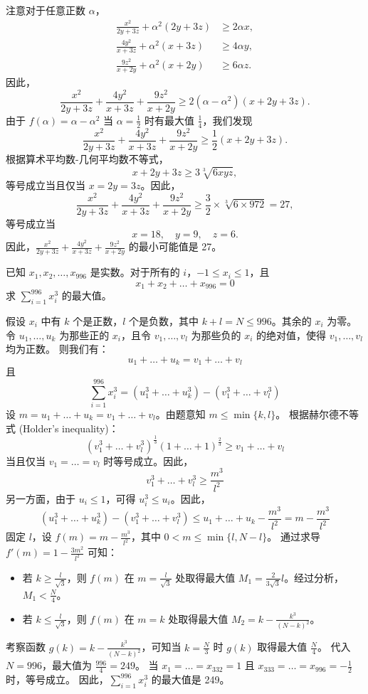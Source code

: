 \begin{questions}
\begin{solution}
注意对于任意正数 $\alpha$，
\begin{align*}
\frac{x^2}{2y + 3z} + \alpha^2(2y + 3z) &\ge 2\alpha x, \\
\frac{4y^2}{x + 3z} + \alpha^2(x + 3z) &\ge 4\alpha y, \\
\frac{9z^2}{x + 2y} + \alpha^2(x + 2y) &\ge 6\alpha z.
\end{align*}
因此，
\[
\frac{x^2}{2y + 3z} + \frac{4y^2}{x + 3z} + \frac{9z^2}{x + 2y} \ge 2(\alpha - \alpha^2)(x + 2y + 3z).
\]
由于 $f(\alpha) = \alpha - \alpha^2$ 当 $\alpha = \frac{1}{2}$ 时有最大值 $\frac{1}{4}$，我们发现
\[
\frac{x^2}{2y + 3z} + \frac{4y^2}{x + 3z} + \frac{9z^2}{x + 2y} \ge \frac{1}{2}(x + 2y + 3z).
\]
根据算术平均数-几何平均数不等式，
\[
x + 2y + 3z \ge 3 \sqrt[3]{6xyz},
\]
等号成立当且仅当 $x = 2y = 3z$。因此，
\[
\frac{x^2}{2y + 3z} + \frac{4y^2}{x + 3z} + \frac{9z^2}{x + 2y} \ge \frac{3}{2} \times \sqrt[3]{6 \times 972} = 27,
\]
等号成立当
\[
x = 18, \quad y = 9, \quad z = 6.
\]
因此，$\frac{x^2}{2y + 3z} + \frac{4y^2}{x + 3z} + \frac{9z^2}{x + 2y}$ 的最小可能值是 27。
\end{solution}
    \question 已知 $x_1, x_2, \dots, x_{996}$ 是实数。对于所有的 $i$，$-1 \le x_i \le 1$，且
\[ x_1 + x_2 + \dots + x_{996} = 0 \]
求 $\sum_{i=1}^{996} x_i^3$ 的最大值。

\begin{solution}
假设 $x_i$ 中有 $k$ 个是正数，$l$ 个是负数，其中 $k + l = N \le 996$。其余的 $x_i$ 为零。
令 $u_1, \dots, u_k$ 为那些正的 $x_i$，且令 $v_1, \dots, v_l$ 为那些负的 $x_i$ 的绝对值，使得 $v_1, \dots, v_l$ 均为正数。
则我们有：
\[ u_1 + \dots + u_k = v_1 + \dots + v_l \]
且
\[ \sum_{i=1}^{996} x_i^3 = (u_1^3 + \dots + u_k^3) - (v_1^3 + \dots + v_l^3) \]
设 $m = u_1 + \dots + u_k = v_1 + \dots + v_l$。由题意知 $m \le \min\{k, l\}$。
根据赫尔德不等式 (Holder's inequality)：
\[ (v_1^3 + \dots + v_l^3)^{\frac{1}{3}} (1 + \dots + 1)^{\frac{2}{3}} \ge v_1 + \dots + v_l \]
当且仅当 $v_1 = \dots = v_l$ 时等号成立。因此，
\[ v_1^3 + \dots + v_l^3 \ge \frac{m^3}{l^2} \]
另一方面，由于 $u_i \le 1$，可得 $u_i^3 \le u_i$。因此，
\[ (u_1^3 + \dots + u_k^3) - (v_1^3 + \dots + v_l^3) \le u_1 + \dots + u_k - \frac{m^3}{l^2} = m - \frac{m^3}{l^2} \]
固定 $l$，设 $f(m) = m - \frac{m^3}{l^2}$，其中 $0 < m \le \min\{l, N-l\}$。
通过求导 $f'(m) = 1 - \frac{3m^2}{l^2}$ 可知：
\begin{itemize}
    \item 若 $k \ge \frac{l}{\sqrt{3}}$，则 $f(m)$ 在 $m = \frac{l}{\sqrt{3}}$ 处取得最大值 $M_1 = \frac{2}{3\sqrt{3}}l$。经过分析，$M_1 < \frac{N}{4}$。
    \item 若 $k \le \frac{l}{\sqrt{3}}$，则 $f(m)$ 在 $m = k$ 处取得最大值 $M_2 = k - \frac{k^3}{(N-k)^2}$。
\end{itemize}
考察函数 $g(k) = k - \frac{k^3}{(N-k)^2}$，可知当 $k = \frac{N}{3}$ 时 $g(k)$ 取得最大值 $\frac{N}{4}$。
代入 $N = 996$，最大值为 $\frac{996}{4} = 249$。
当 $x_1 = \dots = x_{332} = 1$ 且 $x_{333} = \dots = x_{996} = -\frac{1}{2}$ 时，等号成立。
因此，$\sum_{i=1}^{996} x_i^3$ 的最大值是 249。
\end{solution}


\end{questions}
